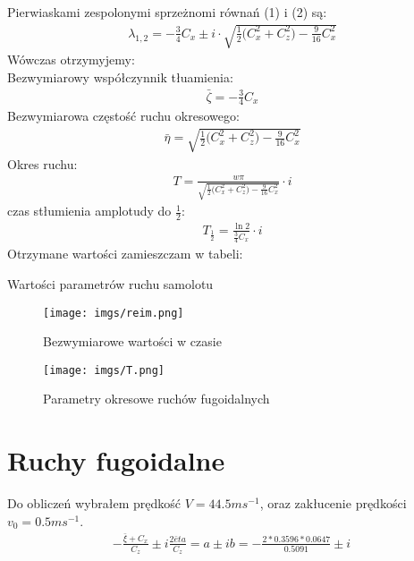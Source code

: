 \documentclass{sprawozdanie}
\begin{document}
Pierwiaskami zespolonymi sprzeżnomi równań (1) i (2) są:
\begin{align*}
    \lambda_{1,2} = -\frac{3}{4} C_x \pm i \cdot \sqrt{\frac{1}{2} \Big( C_x^2+C_z^2 \Big) - \frac{9}{16} C_x^2}
\end{align*}
Wówczas otrzymyjemy:\\
Bezwymiarowy współczynnik tłuamienia:
\begin{align*}
    \bar \zeta = -\frac{3}{4} C_x
\end{align*}
Bezwymiarowa częstość ruchu okresowego:
\begin{align*}
    \bar \eta = \sqrt{\frac{1}{2} \Big( C_x^2+C_z^2 \Big) - \frac{9}{16} C_x^2}
\end{align*}
Okres ruchu:
\begin{align*}
    T = \frac{w \pi}{\sqrt{\frac{1}{2} \Big( C_x^2+C_z^2 \Big) - \frac{9}{16} C_x^2}} \cdot i
\end{align*}
czas stłumienia amplotudy do $\frac{1}{2}$:
\begin{align*}
    T_{\frac{1}{2}} = \frac{\ln 2}{\frac{3}{4}C_x}\cdot i
\end{align*}
Otrzymane wartości zamieszczam w tabeli:
\begin{table}[H]
    \centering
    
    \caption{Wartości parametrów ruchu samolotu}
\end{table}

\begin{figure}[H]
    \centering
    \texttt{[image: imgs/reim.png]}
    \caption{Bezwymiarowe wartości w czasie}
    \label{fig:fig1}
\end{figure}

\begin{figure}[H]
    \centering
    \texttt{[image: imgs/T.png]}
    \caption{Parametry okresowe ruchów fugoidalnych}
\end{figure}

\section{Ruchy fugoidalne}
Do obliczeń wybrałem prędkość $V = 44.5 ms^{-1}$, oraz zakłucenie prędkości $v_0 = 0.5 ms^{-1}$.
\begin{align*}
    -\frac{\bar \xi +C_x}{C_z} \pm i \frac{2\bar eta}{C_z} = a \pm i b = -\frac{2*0.3596*0.0647}{0.5091} \pm i \frac{}{}
\end{align*}
\end{document}
